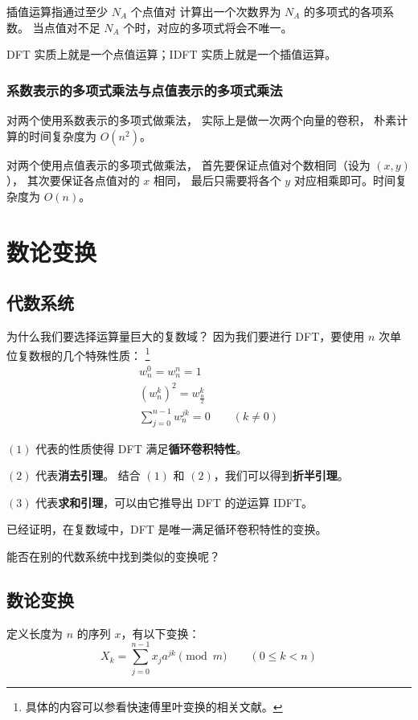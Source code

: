 \documentclass[12pt, UTF8]{article}
\begin{document}
    插值运算指通过至少 $N_A$ 个点值对
    计算出一个次数界为 $N_A$ 的多项式的各项系数。
    当点值对不足 $N_A$ 个时，对应的多项式将会不唯一。

    \bigskip
    DFT 实质上就是一个点值运算；IDFT 实质上就是一个插值运算。

    \subsubsection{系数表示的多项式乘法与点值表示的多项式乘法}
    对两个使用系数表示的多项式做乘法，
    实际上是做一次两个向量的卷积，
    朴素计算的时间复杂度为 $O(n^2)$。

    对两个使用点值表示的多项式做乘法，
    首先要保证点值对个数相同（设为 $(x, y)$），
    其次要保证各点值对的 $x$ 相同，
    最后只需要将各个 $y$ 对应相乘即可。时间复杂度为 $O(n)$。

    \section{数论变换}
    \subsection{代数系统}
    为什么我们要选择运算量巨大的复数域？
    因为我们要进行 DFT，要使用 $n$ 次单位复数根的几个特殊性质：
    \footnote{具体的内容可以参看快速傅里叶变换的相关文献。}
    \begin{gather}
        w_n^0 = w_n^n = 1
        \\
        (w_n^k)^2 = w_{\frac {n} {2}}^k
        \\
        \sum_{j = 0}^{n - 1} w_n^{jk} = 0 \qquad (k \ne 0)
    \end{gather}

    $(1)$ 代表的性质使得 DFT 满足\textbf{循环卷积特性}。
    
    $(2)$ 代表\textbf{消去引理}。
    结合 $(1)$ 和 $(2)$，我们可以得到\textbf{折半引理}。

    $(3)$ 代表\textbf{求和引理}，可以由它推导出 DFT 的逆运算 IDFT。

    \bigskip
    已经证明，在复数域中，DFT 是唯一满足循环卷积特性的变换。
    
    \bigskip
    能否在别的代数系统中找到类似的变换呢？

    \subsection{数论变换}
    定义长度为 $n$ 的序列 $x$，有以下变换：
    \begin{equation*}
        X_k = \sum_{j = 0}^{n - 1} x_j a^{jk} \pmod {m}
        \qquad (0 \le k < n)
    \end{equation*}
\end{document}
